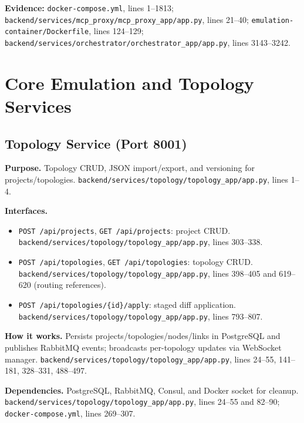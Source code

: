 \documentclass[10pt,a4paper]{article}
\begin{document}
\textbf{Evidence:} \texttt{docker-compose.yml}, lines 1--1813; \texttt{backend/services/mcp\_proxy/mcp\_proxy\_app/app.py}, lines 21--40; \texttt{emulation-container/Dockerfile}, lines 124--129; \texttt{backend/services/orchestrator/orchestrator\_app/app.py}, lines 3143--3242.

\section{Core Emulation and Topology Services}

\subsection{Topology Service (Port 8001)}

\textbf{Purpose.} Topology CRUD, JSON import/export, and versioning for projects/topologies. \texttt{backend/services/topology/topology\_app/app.py}, lines 1--4.

\textbf{Interfaces.}
\begin{itemize}[leftmargin=*]
\item \texttt{POST /api/projects}, \texttt{GET /api/projects}: project CRUD. \texttt{backend/services/topology/topology\_app/app.py}, lines 303--338.
\item \texttt{POST /api/topologies}, \texttt{GET /api/topologies}: topology CRUD. \texttt{backend/services/topology/topology\_app/app.py}, lines 398--405 and 619--620 (routing references).
\item \texttt{POST /api/topologies/\{id\}/apply}: staged diff application. \texttt{backend/services/topology/topology\_app/app.py}, lines 793--807.
\end{itemize}

\textbf{How it works.} Persists projects/topologies/nodes/links in PostgreSQL and publishes RabbitMQ events; broadcasts per-topology updates via WebSocket manager. \texttt{backend/services/topology/topology\_app/app.py}, lines 24--55, 141--181, 328--331, 488--497.

\textbf{Dependencies.} PostgreSQL, RabbitMQ, Consul, and Docker socket for cleanup. \texttt{backend/services/topology/topology\_app/app.py}, lines 24--55 and 82--90; \texttt{docker-compose.yml}, lines 269--307.
\end{document}

